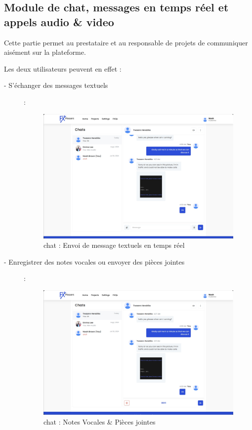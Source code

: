 {\subsection{Module de chat, messages en temps réel et appels audio \& video}

Cette partie permet au prestataire et au responsable de projets de communiquer aisément sur la plateforme.

Les deux utilisateurs peuvent en effet : 

\begin{description}
    \item[- S'échanger des messages textuels] :

\vspace{0.35cm}
\begin{figure}[H]
\begin{center}
\includegraphics[width=12cm]{assets/demo/chat-1.png}
\end{center}
\caption{chat : Envoi de message textuels en temps réel}
\end{figure}

    \item [- Enregistrer des notes vocales ou envoyer des pièces jointes] : 

\vspace{0.35cm}
\begin{figure}[H]
\begin{center}
\includegraphics[width=12cm]{assets/demo/chat-2.png}
\end{center}
\caption{chat : Notes Vocales \& Pièces jointes}
\end{figure}


\end{description}}
